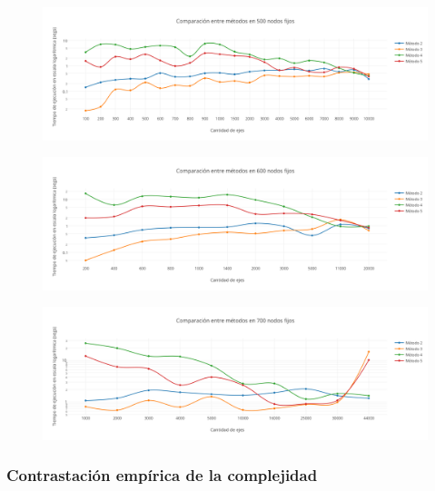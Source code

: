  \newpage
  \begin{figure}[h!]
   \begin{center}
 	\includegraphics[scale=0.5]{imagenes/local/tiempos/500nodos.png}
   \end{center}
 \end{figure}
 
   \begin{figure}[h!]
   \begin{center}
 	\includegraphics[scale=0.5]{imagenes/local/tiempos/600nodos.png}
   \end{center}
 \end{figure}

  \begin{figure}[h!]
   \begin{center}
 	\includegraphics[scale=0.5]{imagenes/local/tiempos/700nodos.png}
   \end{center}
 \end{figure} 
 
\subsubsection{Contrastaci\'on emp\'irica de la complejidad}

